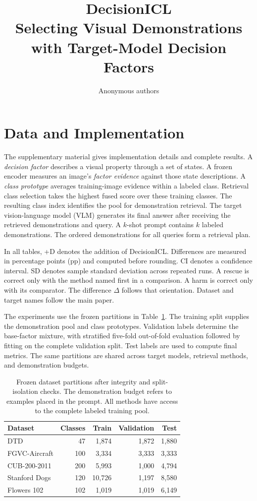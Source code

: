 \documentclass[10pt,twocolumn,letterpaper]{article}
\title{DecisionICL\\Selecting Visual Demonstrations with Target-Model Decision Factors}
\author{Anonymous authors}
\newcommand{\method}{DecisionICL\xspace}
\begin{document}
\maketitlesupplementary
\renewcommand{\thesection}{\Alph{section}}
\renewcommand{\thetable}{S\arabic{table}}
\renewcommand{\thefigure}{S\arabic{figure}}

\section{Data and Implementation}
The supplementary material gives implementation details and complete results. A \emph{decision factor} describes a visual property through a set of states. A frozen encoder measures an image's \emph{factor evidence} against those state descriptions. A \emph{class prototype} averages training-image evidence within a labeled class. Retrieval class selection takes the highest fused score over these training classes. The resulting class index identifies the pool for demonstration retrieval. The target vision-language model (VLM) generates its final answer after receiving the retrieved demonstrations and query. A $k$-shot prompt contains $k$ labeled demonstrations. The ordered demonstrations for all queries form a retrieval plan.

In all tables, +D denotes the addition of \method. Differences are measured in percentage points (pp) and computed before rounding. CI denotes a confidence interval. SD denotes sample standard deviation across repeated runs. A rescue is correct only with the method named first in a comparison. A harm is correct only with its comparator. The difference $\Delta$ follows that orientation. Dataset and target names follow the main paper.

The experiments use the frozen partitions in Table~\ref{tab:splits}. The training split supplies the demonstration pool and class prototypes. Validation labels determine the base-factor mixture, with stratified five-fold out-of-fold evaluation followed by fitting on the complete validation split. Test labels are used to compute final metrics. The same partitions are shared across target models, retrieval methods, and demonstration budgets.

\begin{table}[t]
\caption{Frozen dataset partitions after integrity and split-isolation checks. The demonstration budget refers to examples placed in the prompt. All methods have access to the complete labeled training pool.}
\label{tab:splits}
\centering
\begin{tabular}{lrrrr}
\toprule
Dataset & Classes & Train & Validation & Test \\
\midrule
DTD & 47 & 1,874 & 1,872 & 1,880 \\
FGVC-Aircraft & 100 & 3,334 & 3,333 & 3,333 \\
CUB-200-2011 & 200 & 5,993 & 1,000 & 4,794 \\
Stanford Dogs & 120 & 10,726 & 1,197 & 8,580 \\
Flowers 102 & 102 & 1,019 & 1,019 & 6,149 \\
\bottomrule
\end{tabular}
\end{table}
\end{document}
